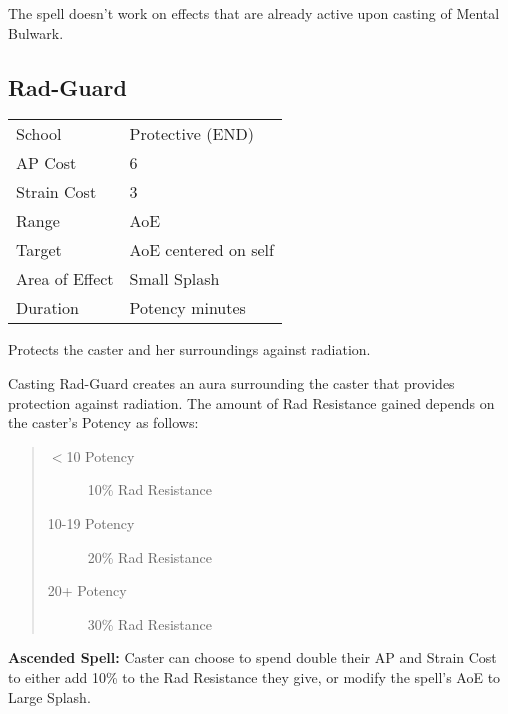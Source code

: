 \documentclass[11pt,a4paper,twocolumn]{book}
\begin{document}
The spell doesn't work on effects that are already active upon casting of Mental Bulwark.


\subsection*{Rad-Guard}
{
	\begin{tabu} to 75mm{| X[l,4] | X[l,7] |}
		\hline
		School 			& Protective (END) 			\\
		AP Cost	      	& 6 						\\
		Strain Cost     & 3 						\\
		Range     		& AoE						\\
		Target      	& AoE centered on self		\\
		Area of Effect  & Small Splash  	 			\\
		Duration     	& Potency minutes			\\ \hline
	\end{tabu}
	
}

\medskip

Protects the caster and her surroundings against radiation.

Casting Rad-Guard creates an aura surrounding the caster that provides protection against radiation. The amount of Rad Resistance gained depends on the caster's Potency as follows:

\begin{quote}
	\begin{description}
		\item[$<$10 Potency] 	10\% Rad Resistance
		\item[10-19 Potency] 	20\% Rad Resistance
		\item[20+ Potency] 		30\% Rad Resistance
	\end{description}	
\end{quote}

\bigskip

\textbf{Ascended Spell:} Caster can choose to spend double their AP and Strain Cost to either add 10\% to the Rad Resistance they give, or modify the spell's AoE to Large Splash.

\end{document}
